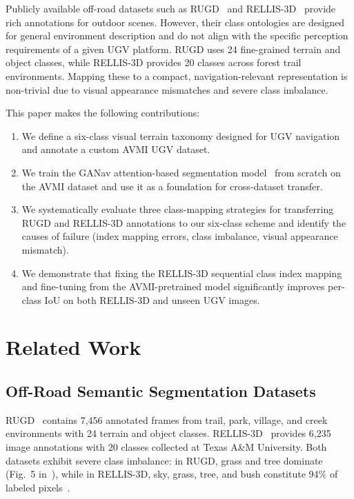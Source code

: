 \documentclass[conference]{IEEEtran}
\begin{document}
Publicly available off-road datasets such as RUGD~\cite{rugd2019} and RELLIS-3D~\cite{rellis2021} provide rich annotations for outdoor scenes. However, their class ontologies are designed for general environment description and do not align with the specific perception requirements of a given UGV platform. RUGD uses 24 fine-grained terrain and object classes, while RELLIS-3D provides 20 classes across forest trail environments. Mapping these to a compact, navigation-relevant representation is non-trivial due to visual appearance mismatches and severe class imbalance.

This paper makes the following contributions:
\begin{enumerate}
    \item We define a six-class visual terrain taxonomy designed for UGV navigation and annotate a custom AVMI UGV dataset.
    \item We train the GANav attention-based segmentation model~\cite{ganav2022} from scratch on the AVMI dataset and use it as a foundation for cross-dataset transfer.
    \item We systematically evaluate three class-mapping strategies for transferring RUGD and RELLIS-3D annotations to our six-class scheme and identify the causes of failure (index mapping errors, class imbalance, visual appearance mismatch).
    \item We demonstrate that fixing the RELLIS-3D sequential class index mapping and fine-tuning from the AVMI-pretrained model significantly improves per-class IoU on both RELLIS-3D and unseen UGV images.
\end{enumerate}

\section{Related Work}

\subsection{Off-Road Semantic Segmentation Datasets}
RUGD~\cite{rugd2019} contains 7,456 annotated frames from trail, park, village, and creek environments with 24 terrain and object classes. RELLIS-3D~\cite{rellis2021} provides 6,235 image annotations with 20 classes collected at Texas A\&M University. Both datasets exhibit severe class imbalance: in RUGD, grass and tree dominate (Fig.~5 in~\cite{rugd2019}), while in RELLIS-3D, sky, grass, tree, and bush constitute 94\% of labeled pixels~\cite{rellis2021}.
\end{document}

